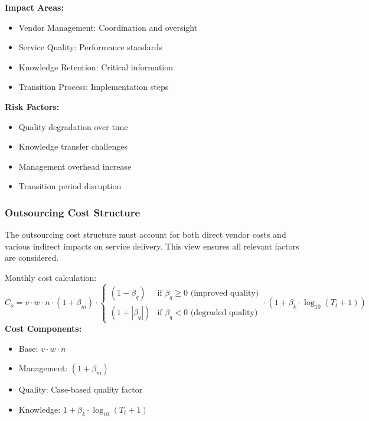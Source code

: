 \documentclass[12pt,a4paper]{article}
\newenvironment{definition}[1]
{\begin{mdframed}[style=definitionstyle,frametitle={Definition: #1}]}
{\end{mdframed}}
\newenvironment{explanation}
{\begin{mdframed}[style=explanationstyle,frametitle={Explanation}]}
{\end{mdframed}}
\begin{document}
\begin{explanation}
\textbf{Impact Areas:}
\begin{itemize}
    \item Vendor Management: Coordination and oversight
    \item Service Quality: Performance standards
    \item Knowledge Retention: Critical information
    \item Transition Process: Implementation steps
\end{itemize}
\textbf{Risk Factors:}
\begin{itemize}
    \item Quality degradation over time
    \item Knowledge transfer challenges
    \item Management overhead increase
    \item Transition period disruption
\end{itemize}
\end{explanation}

\subsubsection{Outsourcing Cost Structure}
The outsourcing cost structure must account for both direct vendor costs and various indirect impacts on service delivery. This view ensures all relevant factors are considered.

\begin{definition}{Outsourcing Cost}
Monthly cost calculation:
\begin{equation}
    C_o = v \cdot w \cdot n \cdot (1 + \beta_m) \cdot \begin{cases}
        (1 - \beta_q) & \text{if } \beta_q \geq 0 \text{ (improved quality)} \\
        (1 + |\beta_q|) & \text{if } \beta_q < 0 \text{ (degraded quality)}
    \end{cases} \cdot (1 + \beta_k \cdot \log_{10}(T_t + 1))
\end{equation}
\textbf{Cost Components:}
\begin{itemize}
    \item Base: $v \cdot w \cdot n$
    \item Management: $(1 + \beta_m)$
    \item Quality: Case-based quality factor
    \item Knowledge: $1 + \beta_k \cdot \log_{10}(T_t + 1)$
\end{itemize}
\end{definition}
\end{document}

